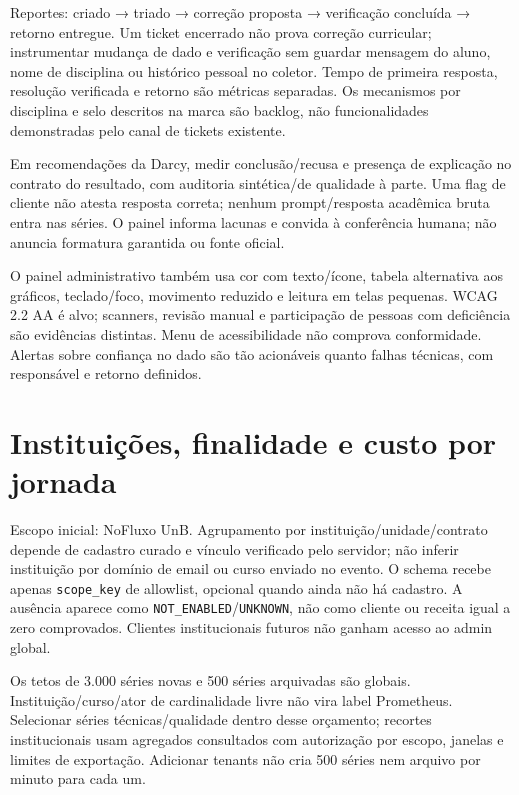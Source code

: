 \documentclass[10pt,a4paper]{article}
\begin{document}
Reportes: criado → triado → correção proposta → verificação concluída →
retorno entregue. Um ticket encerrado não prova correção curricular;
instrumentar mudança de dado e verificação sem guardar mensagem do
aluno, nome de disciplina ou histórico pessoal no coletor. Tempo de
primeira resposta, resolução verificada e retorno são métricas
separadas. Os mecanismos por disciplina e selo descritos na marca são
backlog, não funcionalidades demonstradas pelo canal de tickets
existente.

Em recomendações da Darcy, medir conclusão/recusa e presença de
explicação no contrato do resultado, com auditoria sintética/de
qualidade à parte. Uma flag de cliente não atesta resposta correta;
nenhum prompt/resposta acadêmica bruta entra nas séries. O painel
informa lacunas e convida à conferência humana; não anuncia formatura
garantida ou fonte oficial.

O painel administrativo também usa cor com texto/ícone, tabela
alternativa aos gráficos, teclado/foco, movimento reduzido e leitura em
telas pequenas. WCAG 2.2 AA é alvo; scanners, revisão manual e
participação de pessoas com deficiência são evidências distintas. Menu
de acessibilidade não comprova conformidade. Alertas sobre confiança no
dado são tão acionáveis quanto falhas técnicas, com responsável e
retorno definidos.

\clearpage
\section{Instituições, finalidade e custo por
jornada}\label{instituiuxe7uxf5es-finalidade-e-custo-por-jornada}

Escopo inicial: NoFluxo UnB. Agrupamento por
instituição/unidade/contrato depende de cadastro curado e vínculo
verificado pelo servidor; não inferir instituição por domínio de email
ou curso enviado no evento. O schema recebe apenas {\footnotesize\ttfamily\nolinkurl{scope_key}}
de allowlist, opcional quando ainda não há cadastro. A ausência aparece
como {\footnotesize\ttfamily\nolinkurl{NOT_ENABLED}}/{\footnotesize\ttfamily\nolinkurl{UNKNOWN}}, não como cliente ou receita
igual a zero comprovados. Clientes institucionais futuros não ganham
acesso ao admin global.

Os tetos de 3.000 séries novas e 500 séries arquivadas são globais.
Instituição/curso/ator de cardinalidade livre não vira label Prometheus.
Selecionar séries técnicas/qualidade dentro desse orçamento; recortes
institucionais usam agregados consultados com autorização por escopo,
janelas e limites de exportação. Adicionar tenants não cria 500 séries
nem arquivo por minuto para cada um.
\end{document}
